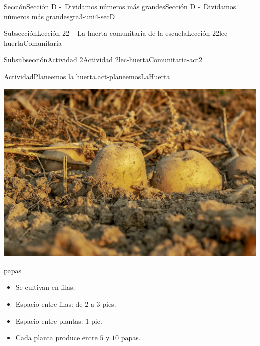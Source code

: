 \documentclass[twoside,10pt,]{article}
\begin{document}
\begin{sectionptx}{Sección}{Sección D -~Dividamos números más grandes}{}{Sección D -~Dividamos números más grandes}{}{}{gra3-uni4-secD}
\begin{subsectionptx}{Subsección}{Lección 22 -~La huerta comunitaria de la escuela}{}{Lección 22}{}{}{lec-huertaComunitaria}
\begin{subsubsectionptx}{Subsubsección}{Actividad 2}{}{Actividad 2}{}{}{lec-huertaComunitaria-act2}
\begin{activity}{Actividad}{Planeemos la huerta.}{act-planeemosLaHuerta}
\begin{sidebyside}{2}{0.025}{0.025}{0.05}
\begin{sbspanel}{0.45}
\includegraphics[width=\linewidth]{external/jpg-source/3-4-D-22 Act2-papas.jpg}
%
\par
papas%
%
\begin{itemize}[label=\textbullet]
\item{}Se cultivan en filas.%
\item{}Espacio entre filas: de \(2\) a \(3\) pies.%
\item{}Espacio entre plantas: \(1\) pie.%
\item{}Cada planta produce entre \(5\) y \(10\) papas.%
\end{itemize}
\end{sbspanel}%
\end{sidebyside}%
\end{activity}%
%
%
%
%
%
%
\end{subsubsectionptx}
\end{subsectionptx}
%
%
\typeout{************************************************}

\end{sectionptx}
\end{document}
